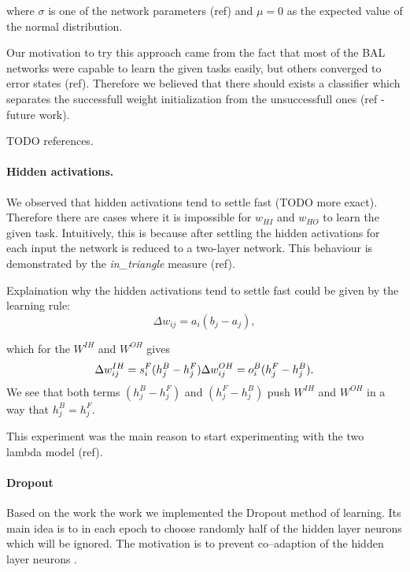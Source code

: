 where $\sigma$ is one of the network parameters (ref) and $\mu = 0$ as the expected value of the normal distribution. 

Our motivation to try this approach came from the fact that most of the BAL networks were capable to learn the given tasks easily, but others converged to error states (ref). Therefore we believed that there should exists a classifier which separates the successfull weight initialization from the unsuccessfull ones (ref - future work). 

TODO references.  

\paragraph{Hidden activations.}

We observed that hidden activations tend to settle fast (TODO more exact). Therefore there are cases where it is impossible for $w_{HI}$ and $w_{HO}$ to learn the given task. Intuitively, this is because after settling the hidden activations for each input the network is reduced to a two-layer network. This behaviour is demonstrated by the \emph{in\_triangle} measure (ref). 

Explaination why the hidden activations tend to settle fast could be given by the learning rule: 
\begin{equation} 
\Delta w_{ij} = a_i(b_j - a_j),
\end{equation} 

which for the $W^{IH}$ and $W^{OH}$ gives
\begin{equation} 
\Delta w_{ij}^{IH} = s^F_i(h^B_j - h^F_j) \\ 
\Delta w_{ij}^{OH} = o^B_i(h^F_j - h^B_j). 
\end{equation} 
We see that both terms $(h^B_j - h^F_j)$ and $(h^F_j - h^B_j)$ push $W^{IH}$ and $W^{OH}$ in a way that $h^B_j = h^F_j$. 

This experiment was the main reason to start experimenting with the two lambda model (ref). 

\paragraph{Dropout}
Based on the work the work \citet{hinton2012improving} we implemented the Dropout method of learning. Its main idea is to in each epoch to choose randomly half of the hidden layer neurons which will be ignored. The motivation is to prevent co--adaption of the hidden layer neurons \citep{hinton2012improving}. 

